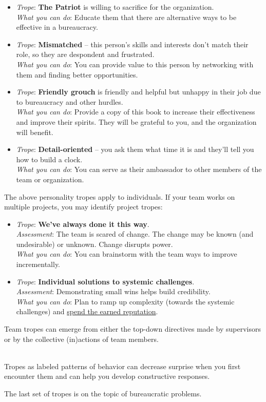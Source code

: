 \begin{itemize}
    \item \textit{Trope}: \textbf{The Patriot} is willing to sacrifice for the organization. \\
    \textit{What you can do}: Educate them that there are alternative ways to be effective in a bureaucracy.
    
    \item \textit{Trope}: \textbf{Mismatched} -- this person's skills and interests don't match their role, so they are despondent and frustrated. \\
    \textit{What you can do}: You can provide value to this person by networking with them and finding better opportunities.
    
    \item \textit{Trope}: \textbf{Friendly grouch} is friendly and helpful but unhappy in their job due to bureaucracy and other hurdles. \\
    \textit{What you can do}: Provide a copy of this book to increase their effectiveness and improve their spirits. They will be grateful to you, and the organization will benefit.
    
    \item \textit{Trope}: \textbf{Detail-oriented} -- you ask them what time it is and they'll tell you how to build a clock. \\
    \textit{What you can do}: You can serve as their ambassador to other members of the team or organization.  
\end{itemize}


The above personality tropes apply to individuals. If your team works on multiple projects, you may identify project tropes:
\begin{itemize}
    \item \textit{Trope}: \textbf{We've always done it this way}.\\
    \textit{Assessment}: The team is scared of change. The change may be known (and undesirable) or unknown. Change disrupts power.\\
    \textit{What you can do}: You can brainstorm with the team ways to improve incrementally. 

    \item \textit{Trope}: \textbf{Individual solutions to systemic challenges}.\\
    \textit{Assessment}: Demonstrating small wins helps build credibility. \\
    \textit{What you can do}: Plan to ramp up  complexity (towards the systemic challenges) and \hyperref[sec:reputation]{spend the earned reputation}.
\end{itemize}
Team tropes can emerge from either the top-down directives made by supervisors or by the collective (in)actions of team members.


\ \\


Tropes as labeled patterns of behavior can decrease surprise when you first encounter them and can help you develop constructive responses. 

The last set of tropes is on the topic of bureaucratic problems. 